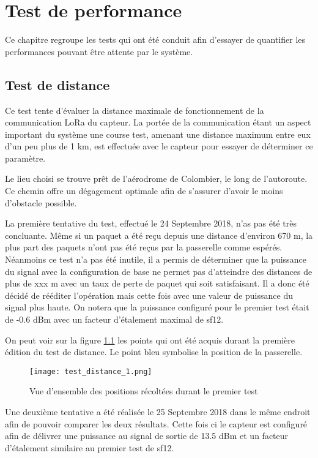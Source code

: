 
\chapter{Test de performance}

Ce chapitre regroupe les tests qui ont été conduit afin d'essayer de quantifier les performances pouvant être attente par le système.

\section{Test de distance}

Ce test tente d'évaluer la distance maximale de fonctionnement de la communication LoRa du capteur. La portée de la communication étant un aspect important du système une course test, amenant une distance maximum entre eux d'un peu plus de 1 km, est effectuée avec le capteur pour essayer de déterminer ce paramètre.

Le lieu choisi se trouve prêt de l'aérodrome de Colombier, le long de l'autoroute. Ce chemin offre un dégagement optimale afin de s'assurer d'avoir le moins d'obstacle possible.

La première tentative du test, effectué le 24 Septembre 2018, n'as pas été très concluante. Même si un paquet a été reçu depuis une distance d'environ 670 m, la plus part des paquets n'ont pas été reçus par la passerelle comme espérés. Néanmoins ce test n'a pas été inutile, il a permis de déterminer que la puissance du signal avec la configuration de base ne permet pas d'atteindre des distances de plus de xxx m avec un taux de perte de paquet qui soit satisfaisant. Il a donc été décidé de rééditer l'opération mais cette fois avec une valeur de puissance du signal plus haute. On notera que la puissance configuré pour le premier test était de -0.6 dBm avec un facteur d'étalement maximal de sf12.

On peut voir sur la figure \ref{fig:test_distance_11} les points qui ont été acquis durant la première édition du test de distance. Le point bleu symbolise la position de la passerelle.

\begin{figure}[htb]
\centering 
\texttt{[image: test\_distance\_1.png]} 
\caption{Vue d'ensemble des positions récoltées durant le premier test}
\label{fig:test_distance_11}
\end{figure}

Une deuxième tentative a été réalisée le 25 Septembre 2018 dans le même endroit afin de pouvoir comparer les deux résultats. Cette fois ci le capteur est configuré afin de délivrer une puissance au signal de sortie de 13.5 dBm et un facteur d'étalement similaire au premier test de sf12.

